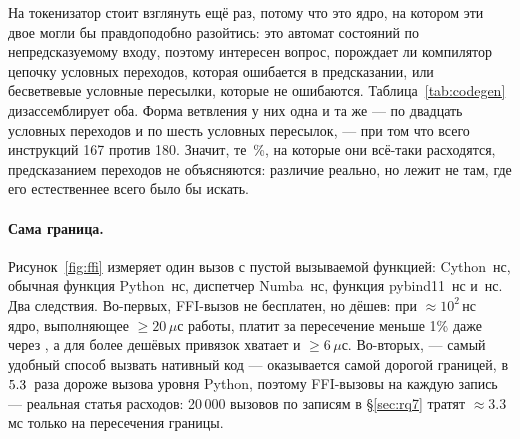 На токенизатор стоит взглянуть ещё раз, потому что это ядро, на котором эти двое могли бы
правдоподобно разойтись: это автомат состояний по непредсказуемому входу, поэтому интересен вопрос,
порождает ли компилятор цепочку условных переходов, которая ошибается в предсказании, или
бесветвевые условные пересылки, которые не ошибаются. Таблица~\ref{tab:codegen} дизассемблирует
оба. Форма ветвления у них одна и та же --- по двадцать условных переходов и по шесть условных
пересылок, --- при том что всего инструкций 167 против 180. Значит, те \,\%, на которые они
всё-таки расходятся, предсказанием переходов не объясняются: различие реально, но лежит не там,
где его естественнее всего было бы искать.

\begin{table}[t]
  \centering
  \caption{В2: токенизатор, дизассемблированный из обеих разделяемых библиотек. Подсчитываемые
  мнемоники специфичны для архитектуры и записаны вместе с ней в
  .}
  \label{tab:codegen}
  \small
  
\end{table}

\paragraph{Сама граница.} Рисунок~\ref{fig:ffi} измеряет один вызов с пустой вызываемой функцией:
Cython \,нс, обычная функция Python \,нс, диспетчер Numba \,нс, функция pybind11 \,нс и
 \,нс. Два следствия. Во-первых, FFI-вызов не бесплатен, но дёшев: при
$\approx 10^2$\,нс ядро, выполняющее $\ge 20\,\mu$с работы, платит за пересечение меньше 1\% даже
через , а для более дешёвых привязок хватает и $\ge 6\,\mu$с.
Во-вторых,  --- самый удобный способ вызвать нативный код --- оказывается самой
дорогой границей, в $\meas{ratio:b1_compute-314:call_overhead/c_ctypes|b1_compute-314:call_overhead/python_function}{5.3}$~раза дороже вызова уровня Python, поэтому FFI-вызовы на каждую запись ---
реальная статья расходов: 20\,000 вызовов  по записям в \S\ref{sec:rq7} тратят
$\approx 3.3$\,мс только на пересечения границы.

